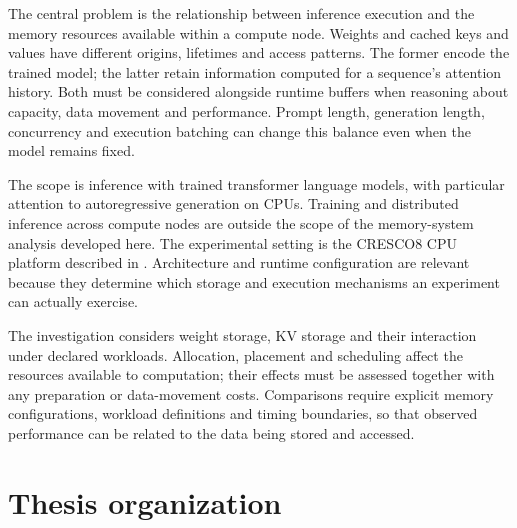 The central problem is the relationship between inference execution and
the memory resources available within a compute node.  Weights and
cached keys and values have different origins, lifetimes and access
patterns.  The former encode the trained model; the latter retain
information computed for a sequence's attention history.  Both must be
considered alongside runtime buffers when reasoning about capacity,
data movement and performance.  Prompt length, generation length,
concurrency and execution batching can change this balance even when
the model remains fixed.

The scope is inference with trained transformer language models, with
particular attention to autoregressive generation on CPUs.  Training
and distributed inference across compute nodes are outside the scope
of the memory-system analysis developed here.  The experimental setting
is the CRESCO8 CPU platform described in
.  Architecture and runtime
configuration are relevant because they determine which storage and
execution mechanisms an experiment can actually exercise.

The investigation considers weight storage, KV storage and their
interaction under declared workloads.  Allocation, placement and
scheduling affect the resources available to computation; their effects
must be assessed together with any preparation or data-movement costs.
Comparisons require explicit memory configurations, workload definitions
and timing boundaries, so that observed performance can be related to
the data being stored and accessed.

\section{Thesis organization}

